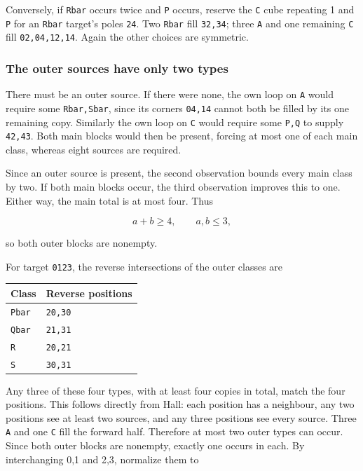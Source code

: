 \documentclass[
  10pt,
]{article}
\begin{document}
Conversely, if \texttt{Rbar} occurs twice and \texttt{P} occurs, reserve
the \texttt{C} cube repeating 1 and \texttt{P} for an \texttt{Rbar}
target's poles \texttt{24}. Two \texttt{Rbar} fill \texttt{32,34}; three
\texttt{A} and one remaining \texttt{C} fill \texttt{02,04,12,14}. Again
the other choices are symmetric.

\hypertarget{the-outer-sources-have-only-two-types}{%
\subsubsection*{The outer sources have only two
types}\label{the-outer-sources-have-only-two-types}}

There must be an outer source. If there were none, the own loop on
\texttt{A} would require some \texttt{Rbar,Sbar}, since its corners
\texttt{04,14} cannot both be filled by its one remaining copy.
Similarly the own loop on \texttt{C} would require some \texttt{P,Q} to
supply \texttt{42,43}. Both main blocks would then be present, forcing
at most one of each main class, whereas eight sources are required.

Since an outer source is present, the second observation bounds every
main class by two. If both main blocks occur, the third observation
improves this to one. Either way, the main total is at most four. Thus

\[
a+b\ge4,\qquad a,b\le3,
\]

so both outer blocks are nonempty.

For target \texttt{01\textbar{}23}, the reverse intersections of the
outer classes are

\begin{longtable}[]{@{}ll@{}}
\toprule\noalign{}
Class & Reverse positions \\
\midrule\noalign{}
\endhead
\bottomrule\noalign{}
\endlastfoot
\texttt{Pbar} & \texttt{20,30} \\
\texttt{Qbar} & \texttt{21,31} \\
\texttt{R} & \texttt{20,21} \\
\texttt{S} & \texttt{30,31} \\
\end{longtable}

Any three of these four types, with at least four copies in total, match
the four positions. This follows directly from Hall: each position has a
neighbour, any two positions see at least two sources, and any three
positions see every source. Three \texttt{A} and one \texttt{C} fill the
forward half. Therefore at most two outer types can occur. Since both
outer blocks are nonempty, exactly one occurs in each. By interchanging
0,1 and 2,3, normalize them to
\end{document}
